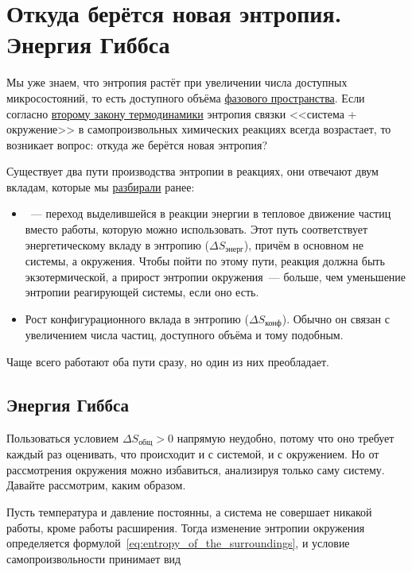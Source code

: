 \clearpage

\section[Откуда берётся новая энтропия. Энергия Гиббса]{Откуда берётся новая энтропия.\\Энергия Гиббса}

Мы уже знаем, что энтропия растёт при увеличении числа доступных микросостояний, то есть доступного объёма \hyperref[term:phase_space]{фазового пространства}. Если согласно \hyperref[term:second_law_of_thermodynamics]{второму закону термодинамики} энтропия связки <<система + окружение>> в самопроизвольных химических реакциях всегда возрастает, то возникает вопрос: откуда же берётся новая энтропия?

Существует два пути производства энтропии в реакциях, они отвечают двум вкладам, которые мы \hyperref[tab:microstates]{разбирали} ранее:

\begin{itemize}
    \item {}~--- переход выделившейся в реакции энергии в тепловое движение частиц вместо работы, которую можно использовать. Этот путь соответствует энергетическому вкладу в энтропию ($\Delta S_{\text{энерг}}$), причём в основном не системы, а окружения. Чтобы пойти по этому пути, реакция должна быть экзотермической, а прирост энтропии окружения~--- больше, чем уменьшение энтропии реагирующей системы, если оно есть.
    \item Рост конфигурационного вклада в энтропию ($\Delta S_{\text{конф}}$). Обычно он связан с увеличением числа частиц, доступного объёма и тому подобным.
\end{itemize}

Чаще всего работают оба пути сразу, но один из них преобладает.

\subsection*{Энергия Гиббса}

Пользоваться условием $\Delta S_{\text{общ}} > 0$ напрямую неудобно, потому что оно требует каждый раз оценивать, что происходит и с системой, и с окружением. Но от рассмотрения окружения можно избавиться, анализируя только саму систему. Давайте рассмотрим, каким образом.

Пусть температура и давление постоянны, а система не совершает никакой работы, кроме работы расширения. Тогда изменение энтропии окружения определяется формулой~\eqref{eq:entropy_of_the_surroundings}, и условие самопроизвольности принимает вид

